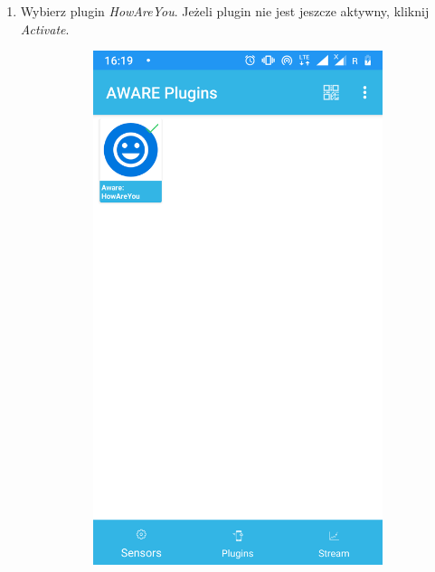 \begin{enumerate}
	\item Wybierz plugin \textit{HowAreYou}. Jeżeli plugin nie jest jeszcze aktywny, kliknij \textit{Activate}.
	
	\begin{figure}[H]
		\centering
		\begin{subfigure}{0.35\textwidth}
			\centering
			\includegraphics[scale=0.14]{dodatekA/3_3.png}
			\subcaption{\label{subfigure_a}}
		\end{subfigure}
		\begin{subfigure}{0.35\textwidth}

\end{subfigure}
\end{figure}
\end{enumerate}
